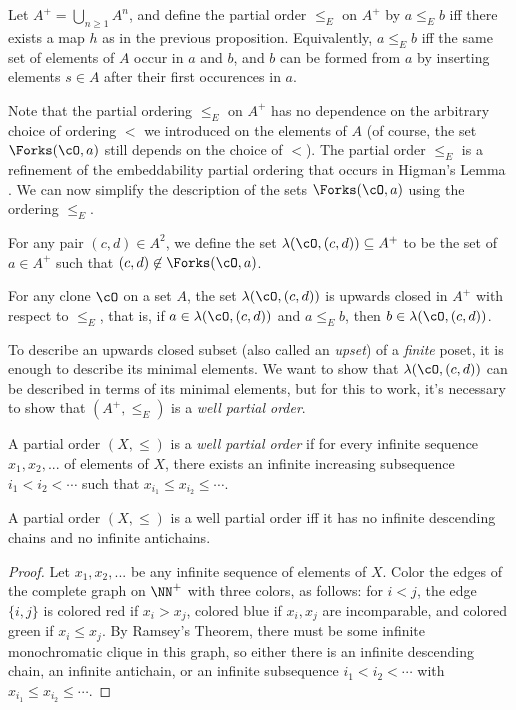 \begin{defn} Let $A^+ = \bigcup_{n \ge 1} A^n$, and define the partial order $\le_E$ on $A^+$ by $a \le_E b$ iff there exists a map $h$ as in the previous proposition. Equivalently, $a \le_E b$ iff the same set of elements of $A$ occur in $a$ and $b$, and $b$ can be formed from $a$ by inserting elements $s \in A$ after their first occurences in $a$.
\end{defn}

Note that the partial ordering $\le_E$ on $A^+$ has no dependence on the arbitrary choice of ordering $<$ we introduced on the elements of $A$ (of course, the set $\Forks(\cO,a)$ still depends on the choice of $<$). The partial order $\le_E$ is a refinement of the embeddability partial ordering that occurs in Higman's Lemma \cite{higmans-lemma}. We can now simplify the description of the sets $\Forks(\cO,a)$ using the ordering $\le_E$.

\begin{defn} For any pair $(c,d) \in A^2$, we define the set $\lambda(\cO,(c,d)) \subseteq A^+$ to be the set of $a \in A^+$ such that $(c,d) \not\in \Forks(\cO,a)$.
\end{defn}

\begin{cor} For any clone $\cO$ on a set $A$, the set $\lambda(\cO,(c,d))$ is upwards closed in $A^+$ with respect to $\le_E$, that is, if $a \in \lambda(\cO,(c,d))$ and $a \le_E b$, then $b \in \lambda(\cO,(c,d))$.
\end{cor}

To describe an upwards closed subset (also called an \emph{upset}) of a \emph{finite} poset, it is enough to describe its minimal elements. We want to show that $\lambda(\cO,(c,d))$ can be described in terms of its minimal elements, but for this to work, it's necessary to show that $(A^+,\le_E)$ is a \emph{well partial order}.

\begin{defn} A partial order $(X,\le)$ is a \emph{well partial order} if for every infinite sequence $x_1, x_2, ...$ of elements of $X$, there exists an infinite increasing subsequence $i_1 < i_2 < \cdots$ such that $x_{i_1} \le x_{i_2} \le \cdots$. 
\end{defn}

\begin{prop} A partial order $(X,\le)$ is a well partial order iff it has no infinite descending chains and no infinite antichains.
\end{prop}
\begin{proof} Let $x_1, x_2, ...$ be any infinite sequence of elements of $X$. Color the edges of the complete graph on $\NN^+$ with three colors, as follows: for $i < j$, the edge $\{i,j\}$ is colored red if $x_i > x_j$, colored blue if $x_i, x_j$ are incomparable, and colored green if $x_i \le x_j$. By Ramsey's Theorem, there must be some infinite monochromatic clique in this graph, so either there is an infinite descending chain, an infinite antichain, or an infinite subsequence $i_1 < i_2 < \cdots$ with $x_{i_1} \le x_{i_2} \le \cdots$.
\end{proof}

